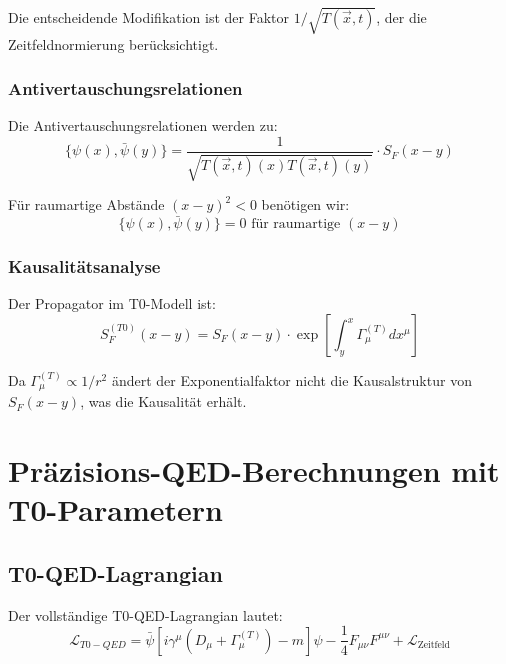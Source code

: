 \documentclass[12pt,a4paper]{article}
\newcommand{\Tfieldt}{T(\vec{x},t)}
\begin{document}
Die entscheidende Modifikation ist der Faktor $1/\sqrt{\Tfieldt}$, der die Zeitfeldnormierung berücksichtigt.

\subsubsection{Antivertauschungsrelationen}
\label{subsubsec:antivertauschung}

Die Antivertauschungsrelationen werden zu:
\begin{equation}
	\{\psi(x), \bar{\psi}(y)\} = \frac{1}{\sqrt{\Tfieldt(x)\Tfieldt(y)}} \cdot S_F(x-y)
	\label{eq:t0_antivertauschung}
\end{equation}

Für raumartige Abstände $(x-y)^2 < 0$ benötigen wir:
\begin{equation}
	\{\psi(x), \bar{\psi}(y)\} = 0 \text{ für raumartige } (x-y)
	\label{eq:kausalitaetsbedingung}
\end{equation}

\subsubsection{Kausalitätsanalyse}
\label{subsubsec:kausalitaetsanalyse}

Der Propagator im T0-Modell ist:
\begin{equation}
	S_F^{(T0)}(x-y) = S_F(x-y) \cdot \exp\left[\int_y^x \Gamma_{\mu}^{(T)} dx^{\mu}\right]
	\label{eq:t0_propagator}
\end{equation}

Da $\Gamma_{\mu}^{(T)} \propto 1/r^2$ ändert der Exponentialfaktor nicht die Kausalstruktur von $S_F(x-y)$, was die Kausalität erhält.

\section{Präzisions-QED-Berechnungen mit T0-Parametern}
\label{sec:praezision_qed_t0}

\subsection{T0-QED-Lagrangian}
\label{subsec:t0_qed_lagrangian}

Der vollständige T0-QED-Lagrangian lautet:
\begin{equation}
	\mathcal{L}_{T0-QED} = \bar{\psi}[i\gamma^{\mu}(D_{\mu} + \Gamma_{\mu}^{(T)}) - m]\psi - \frac{1}{4}F_{\mu\nu}F^{\mu\nu} + \mathcal{L}_{\text{Zeitfeld}}
	\label{eq:t0_qed_lagrangian}
\end{equation}
\end{document}
